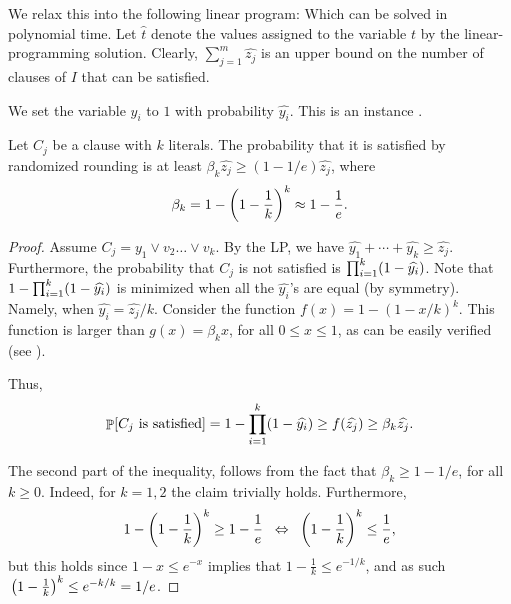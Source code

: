 We relax this into the following linear program:
Which can be solved in polynomial time. Let
$\widehat{t}$ denote the values assigned to the
variable $t$ by the linear-programming solution. Clearly,
$\sum_{j=1}^{m} \widehat{z_j}$ is an upper bound on the
number of clauses of $I$ that can be satisfied.

We set the variable $y_i$ to $1$ with probability
$\widehat{y_i}$. This is an instance .

\begin{lemma}
    Let $C_j$ be a clause with $k$ literals. The probability
    that it is satisfied by randomized rounding is at least
    $\beta_k \widehat{z_j} \geq (1-1/e)\widehat{z_j}$, where
    \begin{equation*}
        \beta_k = 1- \pth{1-\frac{1}{k}}^k \approx 1-\frac{1}{e}.
    \end{equation*}
\end{lemma}

\begin{proof}
    Assume $C_j = y_1 \lor v_2 \ldots \lor v_k$. By the L{}P, we have
    $\widehat{y_1} + \cdots + \widehat{y_k} \geq
    \widehat{z_j}$. Furthermore, the probability that $C_j$ is not
    satisfied is $\prod_{i=1}^{k} \pth{ 1- \widehat{y_i}}$. Note that
    $1 - \prod_{i=1}^{k} \pth{ 1- \widehat{y_i}}$ is minimized when
    all the $\widehat{y_i}$'s are equal (by symmetry). Namely, when
    $\widehat{y_i} = \widehat{z_j}/k$. Consider the function $f(x) = 1
    - (1-x/k)^k$. This  function is larger than
    $g(x) = \beta_k x$, for all $0 \leq x \leq 1$, as can be easily
    verified (see ).

    
    Thus,
    \begin{align*}
    \Prob{C_j \text{ is satisfied} } = 1 - \prod_{i=1}^{k}
    \pth{ 1- \widehat{y_i}} \geq f\pth{\widehat{z_j}} \geq
    \beta_k \widehat{z_j}.
    \end{align*}
    
    The second part of the inequality, follows from the fact that
    $\beta_k \geq 1-1/e$, for all $k\geq 0$.  Indeed, for $k=1,2$ the
    claim trivially holds.  Furthermore,
    \begin{align*}
    1 - \pth{1-\frac{1}{k}}^k \geq 1 - \frac{1}{e}
    \;\; \Leftrightarrow \;\; \pth{1-\frac{1}{k}}^k \leq \frac{1}{e},
    \end{align*}
    but this holds since $1-x \leq e^{-x}$ implies that
    $1-\frac{1}{k} \leq e^{-1/k}$, and as such $\,\pth[]{1-\frac{1}{k}}^k
    \leq e^{-k/k} = 1/e$.
\end{proof}

